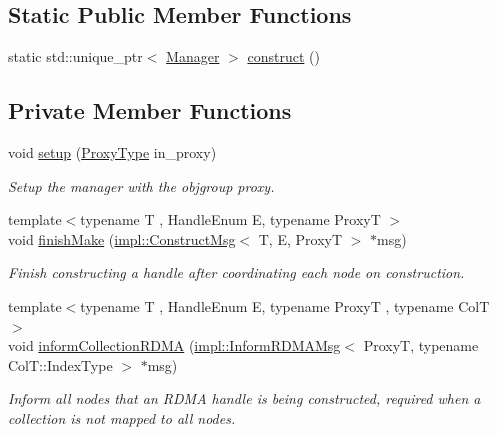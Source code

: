 \subsection*{Static Public Member Functions}
\begin{DoxyCompactItemize}
\item 
static std\+::unique\+\_\+ptr$<$ \hyperlink{structvt_1_1rdma_1_1_manager}{Manager} $>$ \hyperlink{structvt_1_1rdma_1_1_manager_ab79a91b3feabfc37e6f0b5000e9d3949}{construct} ()
\end{DoxyCompactItemize}
\subsection*{Private Member Functions}
\begin{DoxyCompactItemize}
\item 
void \hyperlink{structvt_1_1rdma_1_1_manager_a15ba4b8e5b58df7f050fc1cdaf5f2bcd}{setup} (\hyperlink{structvt_1_1rdma_1_1_manager_a75d5cdc6428ea19f5ec665b04dcd7166}{Proxy\+Type} in\+\_\+proxy)
\begin{DoxyCompactList}\small\item\em Setup the manager with the objgroup proxy. \end{DoxyCompactList}\item 
{\footnotesize template$<$typename T , Handle\+Enum E, typename ProxyT $>$ }\\void \hyperlink{structvt_1_1rdma_1_1_manager_a462f2059efb91643275a921c84f72f67}{finish\+Make} (\hyperlink{structvt_1_1rdma_1_1impl_1_1_construct_msg}{impl\+::\+Construct\+Msg}$<$ T, E, ProxyT $>$ $\ast$msg)
\begin{DoxyCompactList}\small\item\em Finish constructing a handle after coordinating each node on construction. \end{DoxyCompactList}\item 
{\footnotesize template$<$typename T , Handle\+Enum E, typename ProxyT , typename ColT $>$ }\\void \hyperlink{structvt_1_1rdma_1_1_manager_a5dfbaf5c43691eaf3dcce5b14c4d8951}{inform\+Collection\+R\+D\+MA} (\hyperlink{structvt_1_1rdma_1_1impl_1_1_inform_r_d_m_a_msg}{impl\+::\+Inform\+R\+D\+M\+A\+Msg}$<$ ProxyT, typename Col\+T\+::\+Index\+Type $>$ $\ast$msg)
\begin{DoxyCompactList}\small\item\em Inform all nodes that an R\+D\+MA handle is being constructed, required when a collection is not mapped to all nodes. \end{DoxyCompactList}\end{DoxyCompactItemize}
